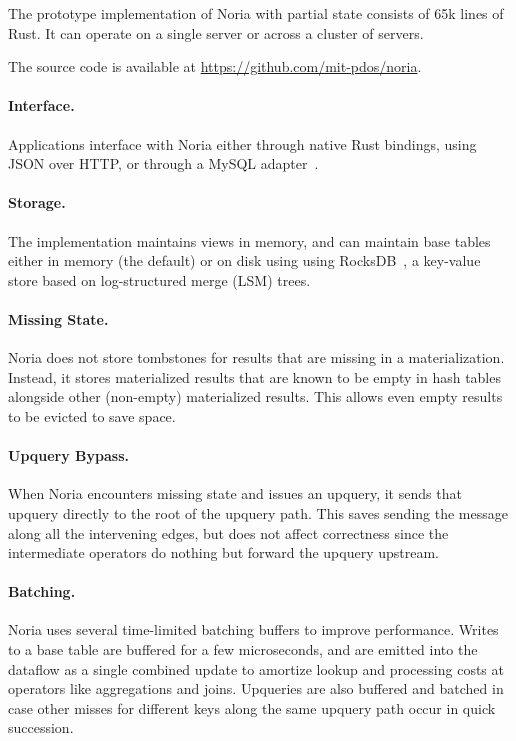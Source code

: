 The prototype implementation of Noria with partial state consists of 65k lines
of Rust. It can operate on a single server or across a cluster of servers.

The source code is available at \url{https://github.com/mit-pdos/noria}.

\paragraph{Interface.}
Applications interface with Noria either through native Rust bindings, using
JSON over HTTP, or through a MySQL adapter~\cite{noria-mysql}.

\paragraph{Storage.}
The implementation maintains views in memory, and can maintain base tables
either in memory (the default) or on disk using using RocksDB~\cite{rocksdb}, a
key-value store based on log-structured merge (LSM) trees.

\paragraph{Missing State.}
Noria does not store tombstones for results that are missing in a
materialization. Instead, it stores materialized results that are known to be
empty in hash tables alongside other (non-empty) materialized results. This
allows even empty results to be evicted to save space.

\paragraph{Upquery Bypass.}
When Noria encounters missing state and issues an upquery, it sends that
upquery directly to the root of the upquery path. This saves sending the
message along all the intervening edges, but does not affect correctness since
the intermediate operators do nothing but forward the upquery upstream.

\paragraph{Batching.}
Noria uses several time-limited batching buffers to improve performance. Writes
to a base table are buffered for a few microseconds, and are emitted into the
dataflow as a single combined update to amortize lookup and processing costs at
operators like aggregations and joins. Upqueries are also buffered and batched
in case other misses for different keys along the same upquery path occur in
quick succession.

